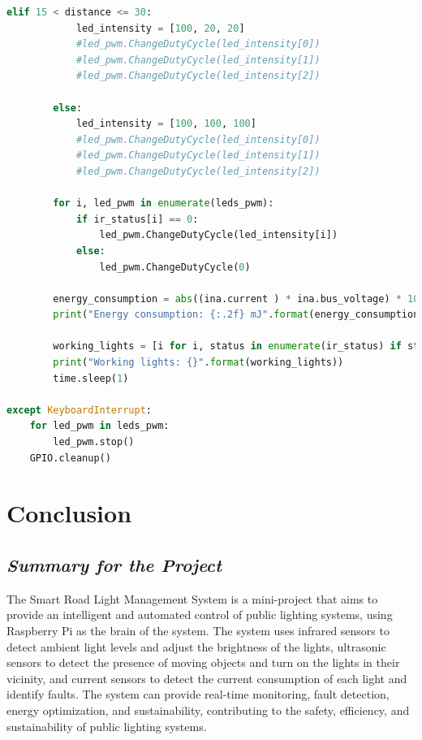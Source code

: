 \documentclass{article}
\begin{document}
\begin{lstlisting}[language=Python]
        elif 15 < distance <= 30:
            led_intensity = [100, 20, 20]
            #led_pwm.ChangeDutyCycle(led_intensity[0])
            #led_pwm.ChangeDutyCycle(led_intensity[1])
            #led_pwm.ChangeDutyCycle(led_intensity[2])    
            
        else:
            led_intensity = [100, 100, 100]
            #led_pwm.ChangeDutyCycle(led_intensity[0])
            #led_pwm.ChangeDutyCycle(led_intensity[1])
            #led_pwm.ChangeDutyCycle(led_intensity[2])

        for i, led_pwm in enumerate(leds_pwm):
            if ir_status[i] == 0:
                led_pwm.ChangeDutyCycle(led_intensity[i])
            else:
                led_pwm.ChangeDutyCycle(0)

        energy_consumption = abs((ina.current ) * ina.bus_voltage) * 10
        print("Energy consumption: {:.2f} mJ".format(energy_consumption))

        working_lights = [i for i, status in enumerate(ir_status) if status == 0]
        print("Working lights: {}".format(working_lights))
        time.sleep(1)
        
except KeyboardInterrupt:
    for led_pwm in leds_pwm:
        led_pwm.stop()
    GPIO.cleanup()
\end{lstlisting}
\section{\textbf{Conclusion}}
\subsection{\textit{Summary for the Project}}
The Smart Road Light Management System is a mini-project that aims to provide an intelligent and automated control of public lighting systems, using Raspberry Pi as the brain of the system. The system uses infrared sensors to detect ambient light levels and adjust the brightness of the lights, ultrasonic sensors to detect the presence of moving objects and turn on the lights in their vicinity, and current sensors to detect the current consumption of each light and identify faults. The system can provide real-time monitoring, fault detection, energy optimization, and sustainability, contributing to the safety, efficiency, and sustainability of public lighting systems.
\end{document}
